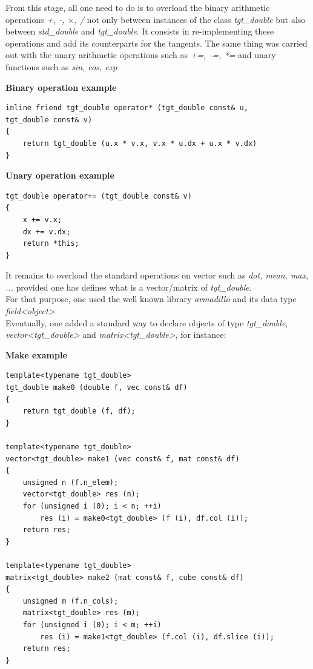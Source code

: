 \documentclass {article}
\begin{document}
			From this stage, all one need to do is to overload the binary arithmetic operations \textit{+, -, $\times$, /} not only between instances of the class \textit{tgt\_double} but also between  \textit{std\_double} and  \textit{tgt\_double}.
			It consists in re-implementing these operations and add its counterparts for the tangents.
			The same thing was carried out with the unary arithmetic operations such as \textit{+=, -=, *=} and unary functions such as \textit{sin, cos, exp}

			\begin{frameth}
			\textbf{Binary operation example}			
\begin{lstlisting}				
inline friend tgt_double operator* (tgt_double const& u, 
tgt_double const& v)
{
	return tgt_double (u.x * v.x, v.x * u.dx + u.x * v.dx)
}
\end{lstlisting}
			\end{frameth}
			
		\begin{frameth}
		\textbf{Unary operation example}
\begin{lstlisting}		
tgt_double operator+= (tgt_double const& v)
{
	x += v.x;
    dx += v.dx;
    return *this;
}		
\end{lstlisting}
		\end{frameth}
		
		It remains to overload the standard operations on vector such as \textit{dot, mean, max, ...} provided one has defines what is a vector/matrix of \textit{tgt\_double}.\\
		For that purpose, one used the well known library \textit{armadillo} and its data type \textit{field<object>}. \\ Eventually, one added a standard way to declare objects of type \textit{tgt\_double},
		\textit{vector<tgt\_double>} and \textit{matrix<tgt\_double>}, for instance:
		 
		\newpage

		 \begin{frameth}
		 \textbf{Make example}
\begin{lstlisting}		
template<typename tgt_double>
tgt_double make0 (double f, vec const& df)
{
    return tgt_double (f, df);
}

template<typename tgt_double>
vector<tgt_double> make1 (vec const& f, mat const& df)
{
    unsigned n (f.n_elem);
    vector<tgt_double> res (n);
	for (unsigned i (0); i < n; ++i) 
		res (i) = make0<tgt_double> (f (i), df.col (i));
    return res;
}

template<typename tgt_double>
matrix<tgt_double> make2 (mat const& f, cube const& df)
{
    unsigned m (f.n_cols);
    matrix<tgt_double> res (m);
	for (unsigned i (0); i < m; ++i) 
		res (i) = make1<tgt_double> (f.col (i), df.slice (i));
    return res;
}
\end{lstlisting}
		\end{frameth}
\end{document}
